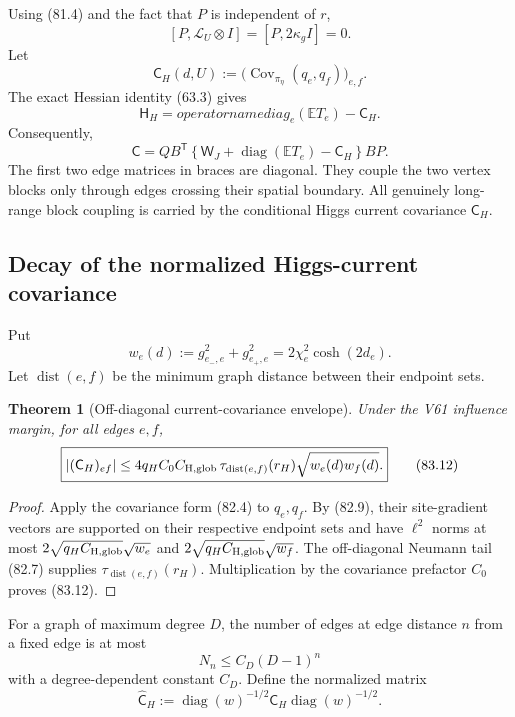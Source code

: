 \documentclass[11pt]{article}
\newtheorem{theorem}{Theorem}[section]
\theoremstyle{remark}
\begin{document}
Using (81.4) and the fact that \(P\) is independent of \(r\),
\[
 [P,\mathscr L_U\otimes I]=[P,2\kappa_gI]=0.      \tag{83.7}
\]
Let
\[
 \mathsf C_H(d,U)
 :=\bigl(\operatorname{Cov}_{\pi_\eta}(q_e,q_f)\bigr)_{e,f}.     \tag{83.8}
\]
The exact Hessian identity (63.3) gives
\[
 \mathsf H_H=operatorname{diag}_e(\mathbb ET_e)-\mathsf C_H.   \tag{83.9}
\]
Consequently,
\[
\boxed{
 \mathsf C
 =QB^{\mathsf T}
 \left\{\mathsf W_J+\operatorname{diag}(\mathbb ET_e)
       -\mathsf C_H\right\}BP.}                  \tag{83.10}
\]
The first two edge matrices in braces are diagonal.  They couple the
two vertex blocks only through edges crossing their spatial boundary.
All genuinely long-range block coupling is carried by the conditional
Higgs current covariance \(\mathsf C_H\).

\subsection{Decay of the normalized Higgs-current covariance}

Put
\[
 w_e(d):=g_{e_-,e}^2+g_{e_+,e}^2
 =2\chi_e^2\cosh(2d_e).                           \tag{83.11}
\]
Let \(\operatorname{dist}(e,f)\) be the minimum graph distance
between their endpoint sets.

\begin{theorem}[Off-diagonal current-covariance envelope]
\label{thm:v17v83-current-decay}
Under the V61 influence margin, for all edges \(e,f\),
\[
\boxed{
 |(\mathsf C_H)_{ef}|
 \leq4q_HC_0C_{\rm H,glob}\,
 \tau_{\operatorname{dist}(e,f)}(r_H)
 \sqrt{w_e(d)w_f(d)}.}                            \tag{83.12}
\]
\end{theorem}

\begin{proof}
Apply the covariance form (82.4) to \(q_e,q_f\).  By (82.9), their
site-gradient vectors are supported on their respective endpoint sets
and have \(\ell^2\) norms at most
\(2\sqrt{q_HC_{\rm H,glob}}\sqrt{w_e}\) and
\(2\sqrt{q_HC_{\rm H,glob}}\sqrt{w_f}\).  The off-diagonal Neumann
tail (82.7) supplies \(\tau_{\operatorname{dist}(e,f)}(r_H)\).
Multiplication by the covariance prefactor \(C_0\) proves (83.12).
\end{proof}

For a graph of maximum degree \(D\), the number of edges at edge
distance \(n\) from a fixed edge is at most
\[
 N_n\leq C_D(D-1)^n                              \tag{83.13}
\]
with a degree-dependent constant \(C_D\).  Define the normalized
matrix
\[
 \widehat{\mathsf C}_H
 :=\operatorname{diag}(w)^{-1/2}
   \mathsf C_H\operatorname{diag}(w)^{-1/2}.      \tag{83.14}
\]
\end{document}
